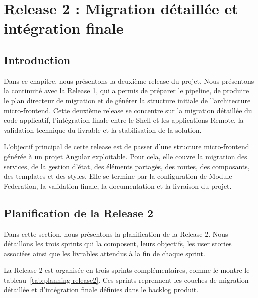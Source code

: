 
\chapter{Release 2 : Migration détaillée et intégration finale}

\section*{Introduction}

Dans ce chapitre, nous présentons la deuxième release du projet. Nous présentons la continuité avec la Release 1, qui a permis de préparer le pipeline, de produire le plan directeur de migration et de générer la structure initiale de l'architecture micro-frontend. Cette deuxième release se concentre sur la migration détaillée du code applicatif, l'intégration finale entre le Shell et les applications Remote, la validation technique du livrable et la stabilisation de la solution.

L'objectif principal de cette release est de passer d'une structure micro-frontend générée à un projet Angular exploitable. Pour cela, elle couvre la migration des services, de la gestion d'état, des éléments partagés, des routes, des composants, des templates et des styles. Elle se termine par la configuration de Module Federation, la validation finale, la documentation et la livraison du projet.

\section{Planification de la Release 2}

Dans cette section, nous présentons la planification de la Release 2. Nous détaillons les trois sprints qui la composent, leurs objectifs, les user stories associées ainsi que les livrables attendus à la fin de chaque sprint.

La Release 2 est organisée en trois sprints complémentaires, comme le montre le tableau~\ref{tab:planning-release2}. Ces sprints reprennent les couches de migration détaillée et d'intégration finale définies dans le backlog produit.

